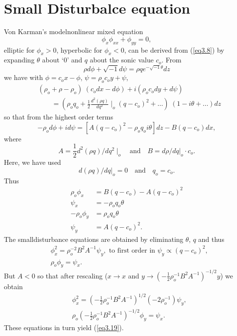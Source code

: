 \section{Small Disturbalce equation}\label{chap3:sec3.6}
Von Karman's model\pageoriginale nonlinear mixed equation
\begin{equation*}
\phi_x  \phi_{xx} + \phi_{yy} = 0, \tag{3.19}\label{eq3.19}
\end{equation*}
elliptic for $\phi_x > 0$, hyperbolic for $\phi_x < 0$, can be derived from (\ref{eq3.8}) by expanding $\theta$ about `$0$' and $q$ about the sonic value $c_o$. From
$$
\rho d \phi + \sqrt{-1} d \psi = \rho q e^{-\sqrt{-1} \theta} dz
$$
we have with $\phi = c_o x - \phi$, $\psi = \rho_o c_o y+ \psi$,
\begin{align*}
& (\rho_o + \rho - \rho_o) \; (c_o dx - d\phi) + i (\rho_o c_o dy + d\psi)\\
& \qquad = (\rho_o q_o + \frac{1}{2} \frac{d^2 (\rho q)}{dq^2} \mid_o (q-c_o)^2 + \ldots) \; (1 - i \theta + \ldots) dz
\end{align*}
so that from the highest order terms
$$
-\rho_o d \phi  + id \psi = [A(q-c_o)^2 - \rho_o q_o i \theta] dz - B (q-c_o) dx,
$$
where 
$$
A = \frac{1}{2} d^2 (\rho q) / dq^2 \mid_o \quad\text{and} \quad  B = d\rho /dq|_o \cdot c_o.
$$
Here, we have used 
$$
d(\rho q ) / d q|_o = 0 \quad \text{and} \quad q_o = c_o. 
$$
Thus
\begin{align*}
\rho_o \phi_x & = B (q-c_o) - A(q-c_o)^2\\
\psi_x & = - \rho_o q_o \theta\\
-\rho_o \phi_y & = \rho_o q_o \theta\\
\psi_y & = A (q-c_o)^2.
\end{align*}
The small\pageoriginale disturbance equations are obtained by eliminating $\theta$, $q$ and thus 
\begin{align*}
& \phi^2_x = \rho^{-2}_o B^2 A^{-1} \psi_y, \text{ to first order in } \psi_y \propto (q-c_o)^2,\\
& \rho_o \phi_y = \psi_x.
\end{align*}
But $A < 0$ so that after rescaling  ($x \to x$ and $y \to (-\frac{1}{2} \rho^{-1}_o B^2 A^{-1})^{-1/2} y$) we obtain
\begin{align*}
& \phi^2_x = (-\frac{1}{2} \rho^{-1}_o B^2 A^{-1})^{1/2} (-2 \rho^{-1}_o) \psi_y, \\
& \rho_o (-\frac{1}{2} \rho^{-1}_o B^2 A^{-1})^{-1/2} \phi_y = \psi_x. 
\end{align*}
These equations in turn yield (\ref{eq3.19}).

